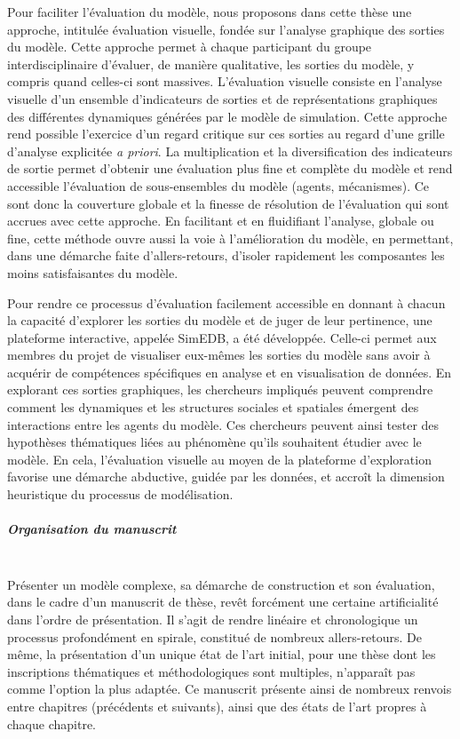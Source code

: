 Pour faciliter l'évaluation du modèle, nous proposons dans cette thèse une approche, intitulée \og évaluation visuelle\fg{}, fondée sur l'analyse graphique des sorties du modèle.
Cette approche permet à chaque participant du groupe interdisciplinaire d'évaluer, de manière qualitative, les sorties du modèle, y compris quand celles-ci sont massives.
L'évaluation visuelle consiste en l'analyse visuelle d'un ensemble d'\og{}indicateurs de sorties\fg{} et de représentations graphiques des différentes dynamiques générées par le modèle de simulation.
Cette approche rend possible l'exercice d'un regard critique sur ces sorties au regard d'une grille d'analyse explicitée \textit{a priori}.
La multiplication et la diversification des indicateurs de sortie permet d'obtenir une évaluation plus fine et complète du modèle et rend accessible l'évaluation de sous-ensembles du modèle (agents, mécanismes).
Ce sont donc la couverture globale et la finesse de résolution de l'évaluation qui sont accrues avec cette approche.
En facilitant et en fluidifiant l'analyse, globale ou fine, cette méthode ouvre aussi la voie à l'amélioration du modèle, en permettant, dans une démarche faite d'allers-retours, d'isoler rapidement les composantes les moins satisfaisantes du modèle.

Pour rendre ce processus d'évaluation facilement accessible en donnant à chacun la capacité d'explorer les sorties du modèle et de juger de leur pertinence, une plateforme interactive, appelée \og SimEDB\fg{}, a été développée.
Celle-ci permet aux membres du projet de visualiser eux-mêmes les sorties du modèle sans avoir à acquérir de compétences spécifiques en analyse et en visualisation de données.
En explorant ces sorties graphiques, les chercheurs impliqués peuvent comprendre comment les dynamiques et les structures sociales et spatiales émergent des interactions entre les agents du modèle.
Ces chercheurs peuvent ainsi tester des hypothèses thématiques liées au phénomène qu'ils souhaitent étudier avec le modèle.
En cela, l'évaluation visuelle au moyen de la plateforme d'exploration favorise une démarche abductive, guidée par les données, et accroît la dimension heuristique du processus de modélisation.


\subparagraph{Organisation du manuscrit}~\\
Présenter un modèle complexe, sa démarche de construction et son évaluation, dans le cadre d'un manuscrit de thèse, revêt forcément une certaine artificialité dans l'ordre de présentation.
Il s'agit de rendre linéaire et chronologique un processus profondément \og en spirale\fg{}, constitué de nombreux allers-retours.
De même, la présentation d'un unique état de l'art initial, pour une thèse dont les inscriptions thématiques et méthodologiques sont multiples, n'apparaît pas comme l'option la plus adaptée.
Ce manuscrit présente ainsi de nombreux renvois entre chapitres (précédents et suivants), ainsi que des états de l'art propres à chaque chapitre.

